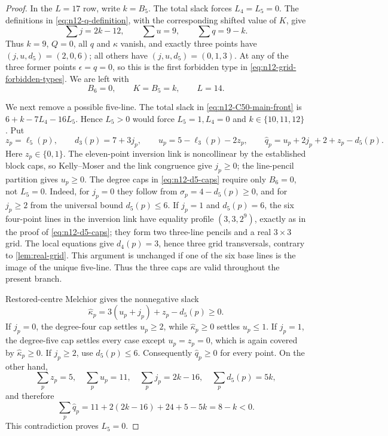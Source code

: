 \begin{proof}
In the $L=17$ row, write $k=B_5$.  The total slack forces
$L_4=L_5=0$.  The definitions in \eqref{eq:n12-q-definition}, with the
corresponding shifted value of $K$, give
\[
 \sum j=2k-12,\qquad \sum u=9,\qquad \sum q=9-k.
\]
Thus $k=9$, $Q=0$, all $q$ and $\kappa$ vanish, and exactly three points have
$(j,u,d_5)=(2,0,6)$; all others have $(j,u,d_5)=(0,1,3)$.  At any of the
three former points $\epsilon=q=0$, so this is the first forbidden type in
\eqref{eq:n12-grid-forbidden-types}.  We are left with
\begin{equation}\label{eq:n12-C50-main-front}
 B_6=0,\qquad K=B_5=k,\qquad L=14.
\end{equation}

We next remove a possible five-line.  The total slack in
\eqref{eq:n12-C50-main-front} is
$6+k-7L_4-16L_5$.  Hence $L_5>0$ would force
$L_5=1,L_4=0$ and $k\in\{10,11,12\}$.  Put
\[
 z_p=\ell_5(p),\qquad d_3(p)=7+3j_p,\qquad
 u_p=5-\ell_3(p)-2z_p,\qquad
 \widehat q_p=u_p+2j_p+2+z_p-d_5(p).
\]
Here $z_p\in\{0,1\}$.  The eleven-point inversion link is noncollinear by
the established block caps, so Kelly--Moser and the link congruence give
$j_p\ge0$; the line-pencil partition gives $u_p\ge0$.  The degree caps in
\eqref{eq:n12-d5-caps} require only $B_6=0$, not $L_5=0$.  Indeed, for
$j_p=0$ they follow from $\sigma_p=4-d_5(p)\ge0$, and for $j_p\ge2$ from
the universal bound $d_5(p)\le6$.  If $j_p=1$ and $d_5(p)=6$, the six
four-point lines in the inversion link have equality profile
$(3,3,2^9)$, exactly as in the proof of \eqref{eq:n12-d5-caps}; they form
two three-line pencils and a real $3\times3$ grid.  The local equations give
$d_4(p)=3$, hence three grid transversals, contrary to
\cref{lem:real-grid}.  This argument is unchanged if one of the six base
lines is the image of the unique five-line.  Thus the three caps are valid
throughout the present branch.

Restored-centre Melchior gives the nonnegative slack
\[
 \widehat\kappa_p=3(u_p+j_p)+z_p-d_5(p)\ge0.
\]
If $j_p=0$, the degree-four cap settles $u_p\ge2$, while
$\widehat\kappa_p\ge0$ settles $u_p\le1$.  If $j_p=1$, the degree-five cap
settles every case except $u_p=z_p=0$, which is again covered by
$\widehat\kappa_p\ge0$.  If $j_p\ge2$, use $d_5(p)\le6$.  Consequently
$\widehat q_p\ge0$ for every point.  On the other hand,
\[
 \sum_pz_p=5,\quad \sum_pu_p=11,\quad
 \sum_pj_p=2k-16,\quad \sum_pd_5(p)=5k,
\]
and therefore
\[
 \sum_p\widehat q_p
 =11+2(2k-16)+24+5-5k=8-k<0.
\]
This contradiction proves $L_5=0$.


\end{proof}
